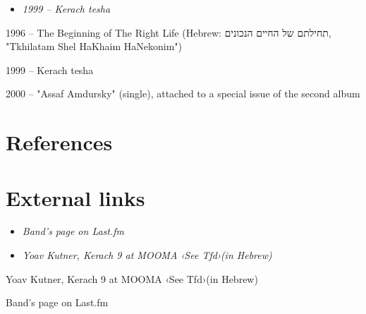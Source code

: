 \begin{itemize}
\item
  \emph{1999 -- Kerach tesha}
\end{itemize}

1996 -- The Beginning of The Right Life (Hebrew: תחילתם של החיים
הנכונים, "Tkhilatam Shel HaKhaim HaNekonim")

1999 -- Kerach tesha

2000 -- "Assaf Amdursky" (single), attached to a special issue of the
second album

\section{References}\label{references}

\section{External links}\label{external-links}

\begin{itemize}
\item
  \emph{Band's page on Last.fm}
\item
  \emph{Yoav Kutner, Kerach 9 at MOOMA ‹See Tfd›(in Hebrew)}
\end{itemize}

Yoav Kutner, Kerach 9 at MOOMA ‹See Tfd›(in Hebrew)

Band's page on Last.fm
